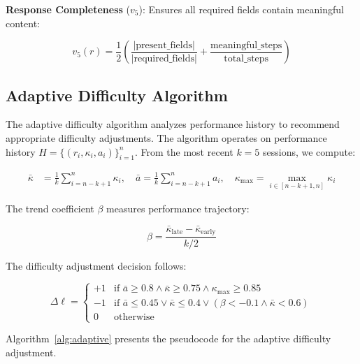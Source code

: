 \documentclass[11pt]{article}
\begin{document}
\textbf{Response Completeness} ($v_5$): Ensures all required fields contain meaningful content:

\begin{equation}
v_5(r) = \frac{1}{2}\left(\frac{|\text{present\_fields}|}{|\text{required\_fields}|} + \frac{\text{meaningful\_steps}}{\text{total\_steps}}\right)
\label{eq:completeness}
\end{equation}

\subsection{Adaptive Difficulty Algorithm}

The adaptive difficulty algorithm analyzes performance history to recommend appropriate difficulty adjustments. The algorithm operates on performance history $H = \{(r_i, \kappa_i, a_i)\}_{i=1}^{n}$. From the most recent $k=5$ sessions, we compute:

\begin{align}
\bar{\kappa} &= \frac{1}{k}\sum_{i=n-k+1}^{n} \kappa_i, \quad
\bar{a} = \frac{1}{k}\sum_{i=n-k+1}^{n} a_i, \quad
\kappa_{\max} = \max_{i \in [n-k+1, n]} \kappa_i
\end{align}

The trend coefficient $\beta$ measures performance trajectory:

\begin{equation}
\beta = \frac{\bar{\kappa}_{\text{late}} - \bar{\kappa}_{\text{early}}}{k/2}
\label{eq:trend}
\end{equation}

The difficulty adjustment decision follows:

\begin{equation}
\Delta\ell = \begin{cases}
+1 & \text{if } \bar{a} \geq 0.8 \land \bar{\kappa} \geq 0.75 \land \kappa_{\max} \geq 0.85 \\[0.3em]
-1 & \text{if } \bar{a} \leq 0.45 \lor \bar{\kappa} \leq 0.4 \lor (\beta < -0.1 \land \bar{\kappa} < 0.6) \\[0.3em]
0 & \text{otherwise}
\end{cases}
\label{eq:difficulty_decision}
\end{equation}

Algorithm~\ref{alg:adaptive} presents the pseudocode for the adaptive difficulty adjustment.
\end{document}
